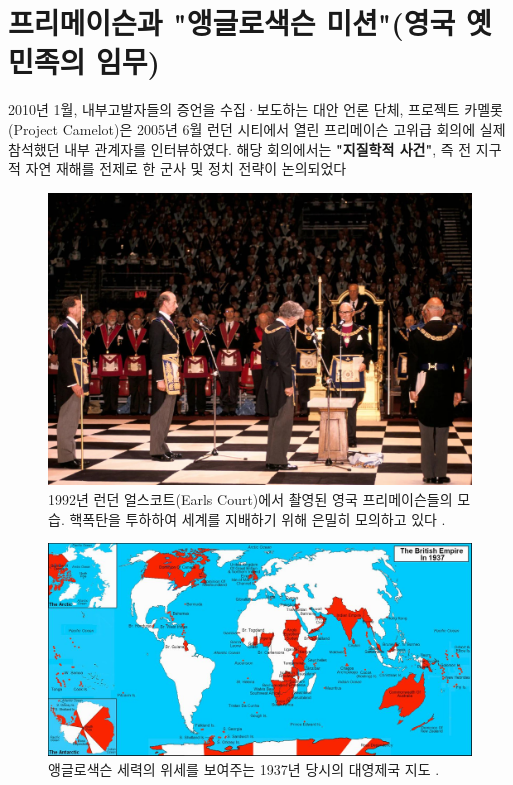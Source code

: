 \documentclass[10pt,twocolumn,letterpaper]{article}
\begin{document}
\section{프리메이슨과 "앵글로색슨 미션"(영국 옛 민족의 임무)}

2010년 1월, 내부고발자들의 증언을 수집·보도하는 대안 언론 단체, 프로젝트 카멜롯(Project Camelot)은 \cite{4,6} 2005년 6월 런던 시티에서 열린 프리메이슨 고위급 회의에 실제 참석했던 내부 관계자를 인터뷰하였다. 해당 회의에서는 \textbf{"지질학적 사건"}, 즉 전 지구적 자연 재해를 전제로 한 군사 및 정치 전략이 논의되었다

\begin{figure}[b]
\begin{center}
   \includegraphics[width=1\linewidth]{freemason.jpg}

\end{center}
   \caption{1992년 런던 얼스코트(Earls Court)에서 촬영된 영국 프리메이슨들의 모습. 핵폭탄을 투하하여 세계를 지배하기 위해 은밀히 모의하고 있다 \cite{5}.}
\label{fig:1}
\label{fig:onecol}
\end{figure}

\begin{figure}[t]
\begin{center}
\includegraphics[width=1\textwidth]{british.jpg}
\end{center}
   \caption{앵글로색슨 세력의 위세를 보여주는 1937년 당시의 대영제국 지도 \cite{14}.}
   \label{fig:2}
\end{figure}
\end{document}
